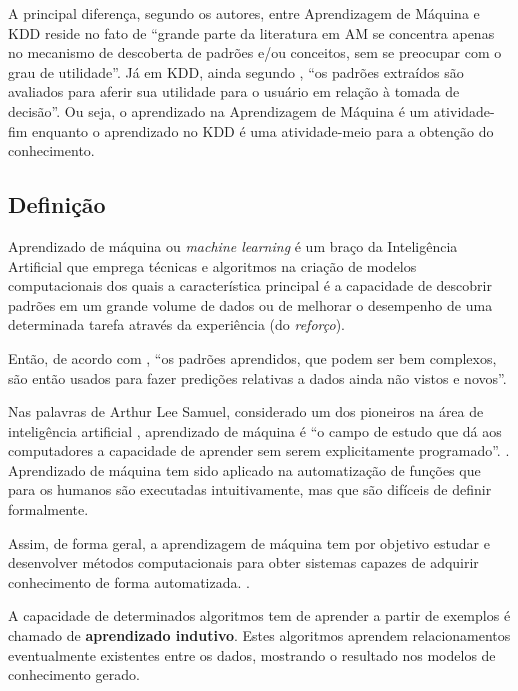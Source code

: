A principal diferença, segundo os autores, \cite{goldschmidt2005} entre Aprendizagem de Máquina e KDD reside no fato de ``grande parte da literatura em AM se concentra apenas no mecanismo de descoberta de padrões e/ou conceitos, sem se preocupar com o grau de utilidade''. Já em KDD, ainda segundo \cite{goldschmidt2005}, ``os padrões extraídos são avaliados para aferir sua utilidade para o usuário em relação à tomada de decisão''. Ou seja, o aprendizado na Aprendizagem de Máquina é um atividade-fim enquanto o aprendizado no KDD é uma atividade-meio para a obtenção do conhecimento.

\subsection{Definição}
Aprendizado de máquina ou \textit{machine learning} é um braço da Inteligência Artificial que emprega técnicas e algoritmos na criação de modelos computacionais dos quais a característica principal é a capacidade de descobrir padrões em um grande volume de dados ou de melhorar o desempenho de uma determinada tarefa através da experiência (do \textit{reforço}).\cite{mohri_foundations_2018} \cite{alpaydin_introduction_2014} \cite{swamynathan_mastering_2019}

Então, de acordo com \cite[p. 278]{baeza-yates_recuperacao_2013}, ``os padrões aprendidos, que podem ser bem complexos, são então usados para fazer predições relativas a dados ainda não vistos e novos''.

Nas palavras de Arthur Lee Samuel, considerado um dos pioneiros na área de inteligência artificial \cite{wiederhold_arthur_1992}, aprendizado de máquina é ``o campo de estudo que dá aos computadores a capacidade de aprender sem serem explicitamente programado''. \cite[p. 89]{simon_too_2013}. Aprendizado de máquina tem sido aplicado na automatização de funções que para os humanos são executadas intuitivamente, mas que são difíceis de definir formalmente. \cite{sarkar_2017}

Assim, de forma geral, a aprendizagem de máquina tem por objetivo estudar e desenvolver métodos computacionais para obter sistemas capazes de adquirir conhecimento de forma automatizada. \cite{lima_ia_2016}.

A capacidade de determinados algoritmos tem de aprender a partir de exemplos é chamado de \textbf{aprendizado indutivo}. Estes algoritmos aprendem relacionamentos eventualmente existentes entre os dados, mostrando o resultado nos modelos de conhecimento gerado. \cite{goldschmidt2005}\cite{alpaydin_introduction_2014}

